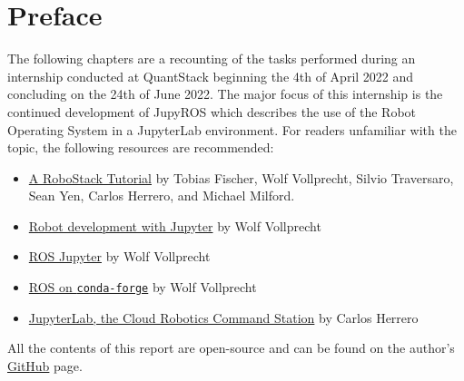 \chapter*{Preface}

The following chapters are a recounting of the tasks performed during an internship conducted at QuantStack beginning the 4th of April 2022 and concluding on the 24th of June 2022. The major focus of this internship is the continued development of JupyROS which describes the use of the Robot Operating System in a JupyterLab environment. For readers unfamiliar with the topic, the following resources are recommended:

\begin{itemize}
    \item \href{https://arxiv.org/pdf/2104.12910.pdf}{A RoboStack Tutorial} by Tobias Fischer, Wolf Vollprecht, Silvio Traversaro, Sean Yen, Carlos Herrero, and Michael Milford.
    \item \href{https://wolfv.medium.com/robot-development-with-jupyter-ddae16d4e688}{Robot development with Jupyter} by Wolf Vollprecht
    \item \href{https://blog.jupyter.org/ros-jupyter-b7e82b5e1202}{ROS \@ Jupyter} by Wolf Vollprecht
    \item \href{https://wolfv.medium.com/ros-on-conda-forge-dca6827ac4b6}{ROS on \texttt{conda-forge}} by Wolf Vollprecht
    \item \href{https://blog.jupyter.org/jupyterlab-ros-3dc9dab7f421}{JupyterLab, the Cloud Robotics Command Station} by Carlos Herrero
\end{itemize}

\noindent All the contents of this report are open-source and can be found on the author's \href{https://github.com/ihuicatl}{GitHub} page.